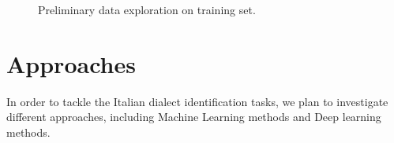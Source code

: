 \documentclass[11pt]{article}
\begin{document}
\begin{figure}[h]
\centering
{}
\hfill
{}
\caption{Preliminary data exploration on training set.}
        \label{fig:dataexpl}
\end{figure}
    \section{Approaches} \label{sec:appr}
        In order to tackle the Italian dialect identification tasks, we plan to investigate different approaches, including Machine Learning methods and Deep learning methods.
\end{document}
